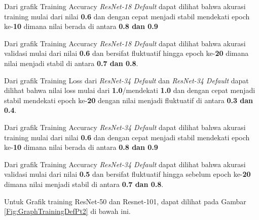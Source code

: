 Dari grafik Training Accuracy \emph{ResNet-18 Default} dapat dilihat bahwa akurasi training mulai dari nilai \textbf{0.6} dan dengan cepat menjadi stabil mendekati epoch ke-\textbf{10} dimana nilai berada di antara \textbf{0.8 dan 0.9} 

Dari grafik Training Accuracy \emph{ResNet-18 Default} dapat dilihat bahwa akurasi validasi mulai dari nilai \textbf{0.6} dan bersifat fluktuatif hingga epoch ke-\textbf{20} dimana nilai menjadi stabil di antara \textbf{0.7 dan 0.8}.

Dari grafik Training Loss dari \emph{ResNet-34 Default} dan \emph{ResNet-34 Default}  dapat dilihat bahwa nilai loss mulai dari \textbf{1.0}/mendekati \textbf{1.0} dan dengan cepat menjadi stabil mendekati epoch ke-\textbf{20} dengan nilai menjadi fluktuatif di antara \textbf{0.3 dan 0.4}.

Dari grafik Training Accuracy \emph{ResNet-34 Default} dapat dilihat bahwa akurasi training mulai dari nilai \textbf{0.6} dan dengan cepat menjadi stabil mendekati epoch ke-\textbf{10} dimana nilai berada di antara \textbf{0.8 dan 0.9} 

Dari grafik Training Accuracy \emph{ResNet-34 Default} dapat dilihat bahwa akurasi validasi mulai dari nilai \textbf{0.5} dan bersifat fluktuatif hingga sebelum epoch ke-\textbf{20} dimana nilai menjadi stabil di antara \textbf{0.7 dan 0.8}.

Untuk Grafik training ResNet-50 dan Resnet-101, dapat dilihat pada Gambar \ref{Fig:GraphTrainingDefPt2} di bawah ini.

